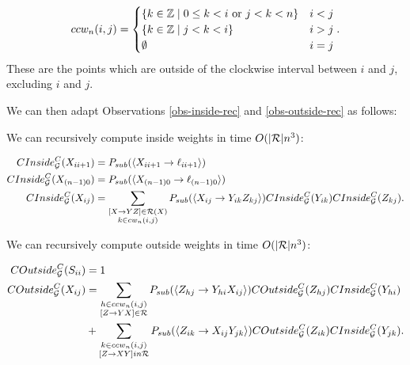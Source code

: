 $$ccw_n(i,j) = 
\begin{cases}
\{k \in {\mathbb Z} \mid 0 \le k < i \mbox{ or } j < k < n \} & i < j \\
\{k \in {\mathbb Z} \mid j < k < i\} & i > j \\
\emptyset & i = j\\
\end{cases}.$$
These are the points which are outside of the clockwise interval
between $i$ and $j$, excluding $i$ and $j$.

We can then adapt Observations \ref{obs-inside-rec} and \ref{obs-outside-rec} as follows:

\begin{prop}
We can recursively compute inside weights in time $O(|{\mathcal R}| n^3)$:

\begin{align*}
CInside_{{\mathcal G}}^C(X_{i i+1}) &= P_{sub} (\langle X_{ii+1} \to \ell_{i i+1}\rangle) \\
CInside_{{\mathcal G}}^C(X_{(n-1)0}) &= P_{sub} (\langle X_{(n-1)0} \to \ell_{(n-1)0}\rangle) \\
CInside_{{\mathcal G}}^C(X_{ij}) &= \sum_{\substack{[X\to YZ]\in {\mathcal R}(X)\\ k\in cw_n(i,j)}} 
P_{sub}(\langle X_{ij} \to Y_{ik} Z_{kj}\rangle) CInside_{{\mathcal G}}^C(Y_{ik}) CInside_{{\mathcal G}}^C(Z_{kj}).
\end{align*}
\end{prop}

\begin{prop}
We can recursively compute outside weights in time $O(|{\mathcal R}| n^3)$:

\begin{align*}
COutside_{{\mathcal G}}^C(S_{ii}) &= 1\\
COutside_{{\mathcal G}}^C(X_{ij}) &=
\sum_{\substack{h\in ccw_n(i,j) \\ [Z\to YX] \in {\mathcal R}}} P_{sub}(\langle Z_{hj} \to Y_{hi} X_{ij} \rangle)
COutside_{{\mathcal G}}^C(Z_{hj}) CInside_{{\mathcal G}}^C(Y_{hi})\\
&+ \sum_{\substack{k \in ccw_n(i,j)\\ [Z\to XY] in {\mathcal R}}}
P_{sub}(\langle Z_{ik} \to X_{ij} Y_{jk} \rangle)
COutside_{{\mathcal G}}^C(Z_{ik}) CInside_{{\mathcal G}}^C(Y_{jk}).
\end{align*}
\end{prop}


